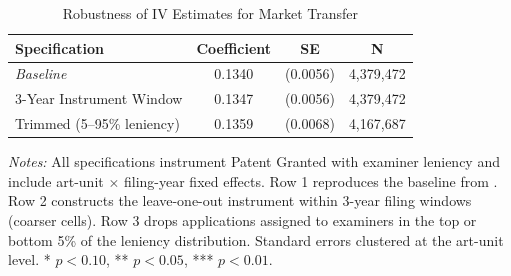 \begin{table}[H]
\centering
\caption{Robustness of IV Estimates for Market Transfer}
\label{tab:robustness}
\begin{threeparttable}
\begin{tabular}{lccc}
\toprule
Specification & Coefficient & SE & N \\
\midrule
\textit{Baseline} & 0.1340 & (0.0056) & 4,379,472 \\
3-Year Instrument Window & 0.1347 & (0.0056) & 4,379,472 \\
Trimmed (5--95\% leniency) & 0.1359 & (0.0068) & 4,167,687 \\
\bottomrule
\end{tabular}
\begin{tablenotes}[flushleft]
\small
\item \textit{Notes:} All specifications instrument Patent Granted with examiner leniency and include art-unit $\times$ filing-year fixed effects. Row 1 reproduces the baseline from . Row 2 constructs the leave-one-out instrument within 3-year filing windows (coarser cells). Row 3 drops applications assigned to examiners in the top or bottom 5\% of the leniency distribution. Standard errors clustered at the art-unit level. * $p<0.10$, ** $p<0.05$, *** $p<0.01$.
\end{tablenotes}
\end{threeparttable}
\end{table}
